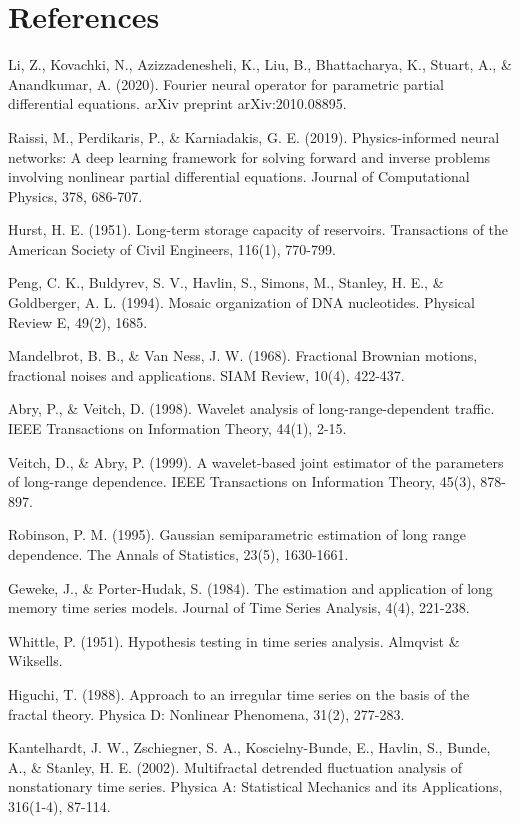 \section*{References}

\begin{thebibliography}{99}
 Li, Z., Kovachki, N., Azizzadenesheli, K., Liu, B., Bhattacharya, K., Stuart, A., \& Anandkumar, A. (2020). Fourier neural operator for parametric partial differential equations. arXiv preprint arXiv:2010.08895.

 Raissi, M., Perdikaris, P., \& Karniadakis, G. E. (2019). Physics-informed neural networks: A deep learning framework for solving forward and inverse problems involving nonlinear partial differential equations. Journal of Computational Physics, 378, 686-707.

 Hurst, H. E. (1951). Long-term storage capacity of reservoirs. Transactions of the American Society of Civil Engineers, 116(1), 770-799.

 Peng, C. K., Buldyrev, S. V., Havlin, S., Simons, M., Stanley, H. E., \& Goldberger, A. L. (1994). Mosaic organization of DNA nucleotides. Physical Review E, 49(2), 1685.

 Mandelbrot, B. B., \& Van Ness, J. W. (1968). Fractional Brownian motions, fractional noises and applications. SIAM Review, 10(4), 422-437.

 Abry, P., \& Veitch, D. (1998). Wavelet analysis of long-range-dependent traffic. IEEE Transactions on Information Theory, 44(1), 2-15.

 Veitch, D., \& Abry, P. (1999). A wavelet-based joint estimator of the parameters of long-range dependence. IEEE Transactions on Information Theory, 45(3), 878-897.

 Robinson, P. M. (1995). Gaussian semiparametric estimation of long range dependence. The Annals of Statistics, 23(5), 1630-1661.

 Geweke, J., \& Porter-Hudak, S. (1984). The estimation and application of long memory time series models. Journal of Time Series Analysis, 4(4), 221-238.

 Whittle, P. (1951). Hypothesis testing in time series analysis. Almqvist \& Wiksells.

 Higuchi, T. (1988). Approach to an irregular time series on the basis of the fractal theory. Physica D: Nonlinear Phenomena, 31(2), 277-283.

 Kantelhardt, J. W., Zschiegner, S. A., Koscielny-Bunde, E., Havlin, S., Bunde, A., \& Stanley, H. E. (2002). Multifractal detrended fluctuation analysis of nonstationary time series. Physica A: Statistical Mechanics and its Applications, 316(1-4), 87-114.

\end{thebibliography}
